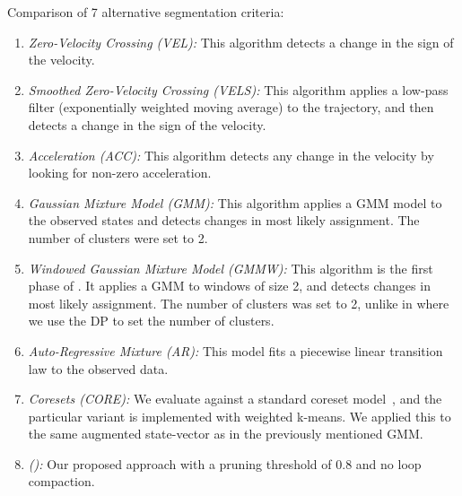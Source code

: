 Comparison of 7 alternative segmentation criteria:
\begin{enumerate}
    \item \emph{Zero-Velocity Crossing (VEL): } This algorithm detects a change in the sign of the velocity. 
    \item \emph{Smoothed Zero-Velocity Crossing (VELS): } This algorithm applies a low-pass filter (exponentially weighted moving average) to the trajectory, and then detects a change in the sign of the velocity.
    \item \emph{Acceleration (ACC): } This algorithm detects any change in the velocity by looking for non-zero acceleration.
    \item \emph{Gaussian Mixture Model (GMM): } This algorithm applies a GMM model to the observed states and detects changes in most likely assignment. The number of clusters were set to 2.
    \item \emph{Windowed Gaussian Mixture Model (GMMW): } This algorithm is the first phase of \tsc. It applies a GMM to windows of size 2, and detects changes in most likely assignment. The number of clusters was set to 2, unlike in \tsc where we use the DP to set the number of clusters.
    \item \emph{Auto-Regressive Mixture (AR): } This model fits a piecewise linear transition law to the observed data.
    \item  \emph{Coresets (CORE): } We evaluate against a standard coreset model~\citep{sung2012trajectory, volkov2015coresets}, and the particular variant is implemented with weighted k-means. We applied this to the same augmented state-vector as in the previously mentioned GMM.
    \item \emph{\tscfull (\tsc): } Our proposed approach with a pruning threshold of $0.8$ and no loop compaction.
\end{enumerate}

